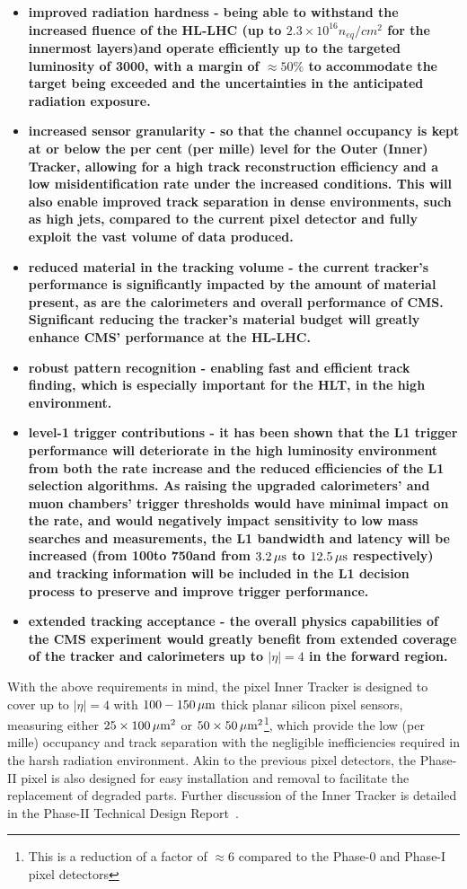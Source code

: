 \begin{itemize}
\item \bf{improved radiation hardness} - being able to withstand the increased fluence of the HL-LHC (up to $2.3\times10^{16} n_{eq}/cm^{2}$ for the innermost layers)and operate efficiently up to the targeted luminosity of 3000\fbinv, with a margin of $\approx50\%$ to accommodate the target being exceeded and the uncertainties in the anticipated radiation exposure.
\item \bf{increased sensor granularity} - so that the channel occupancy is kept at or below the per cent (per mille) level for the Outer (Inner) Tracker, allowing for a high track reconstruction efficiency and a low misidentification rate under the increased \PU conditions. This will also enable improved track separation in dense environments, such as high \pT jets, compared to the current pixel detector and fully exploit the vast volume of data produced.
\item \bf{reduced material in the tracking volume} - the current tracker's performance is significantly impacted by the amount of material present, as are the calorimeters and overall performance of CMS.
Significant reducing the tracker's material budget will greatly enhance CMS' performance at the HL-LHC.
\item \bf{robust pattern recognition} - enabling fast and efficient track finding, which is especially important for the HLT, in the high \PU environment.
\item \bf{level-1 trigger contributions} - it has been shown that the L1 trigger performance will deteriorate in the high luminosity environment from both the rate increase and the reduced efficiencies of the L1 selection algorithms.
As raising the upgraded calorimeters' and muon chambers' trigger thresholds would have minimal impact on the rate, and 	would negatively impact sensitivity to low mass searches and measurements, the L1 bandwidth and latency will be increased (from 100\kHz to 750\kHz and from $3.2\,\mu\text{s}$ to $12.5\,\mu\text{s}$ respectively) and tracking information will be included in the L1 decision process to preserve and improve trigger performance.
\item \bf{extended tracking acceptance} - the overall physics capabilities of the CMS experiment would greatly benefit from extended coverage of the tracker and calorimeters up to $|\eta| = 4$ in the forward region.
\end{itemize}

With the above requirements in mind, the pixel Inner Tracker is designed to cover up to $|\eta| = 4$ with $100-150\,\mu\text{m}$ thick planar silicon pixel sensors, measuring either $25\times100\,\mu\text{m}^{2}$ or $50\times50\,\mu\text{m}^{2}$\footnote{This is a reduction of a factor of $\approx 6$ compared to the Phase-0 and Phase-I pixel detectors}, which provide the low (per mille) occupancy and track separation with the negligible inefficiencies required in the harsh radiation environment.
Akin to the previous pixel detectors, the Phase-II pixel is also designed for easy installation and removal to facilitate the replacement of degraded parts.
Further discussion of the Inner Tracker is detailed in the Phase-II Technical Design Report~\cite{P2TrackerTDR}.

